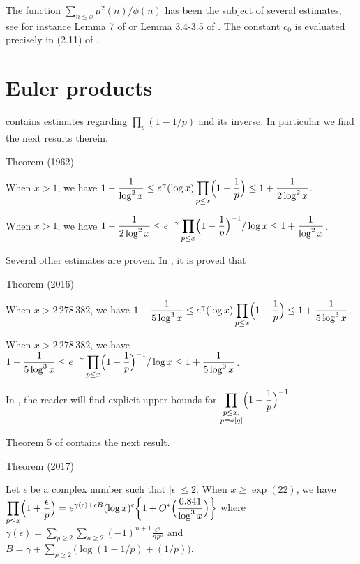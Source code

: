 The function $\sum_{n\le x}\mu^2(n)/\phi(n)$ has been the subject of
several estimates,
see for instance Lemma 7 of
\cite{Montgomery-Vaughan*73}
or Lemma 3.4-3.5 of
\cite{Ramare*95}.
The constant $c_0$ is evaluated precisely in (2.11) of
\cite{Rosser-Schoenfeld*62}.



\section{Euler products
}



\cite{Rosser-Schoenfeld*62}
contains estimates regarding $\prod_{p}(1-1/p)$ and its inverse. In
particular we find the next results therein.

\begin{thm}{Theorem (1962)}

  
    When $x > 1$, we have $\displaystyle 1-\frac{1}{\log^2x}\le
      e^\gamma(\log x)\prod_{p\le x}\Bigl(1-\frac{1}{p}\Bigr)\le
      1+\frac{1}{2\log^2x}$.
    
    When $x > 1$, we have $\displaystyle 1-\frac{1}{2\log^2x}\le
      e^{-\gamma}\prod_{p\le x}\Bigl(1-\frac{1}{p}\Bigr)^{-1}/\log x\le
      1+\frac{1}{\log^2x}$.
    
    
\end{thm}

Several other estimates are proven. In
\cite{Dusart*16}, it is
proved that

\begin{thm}{Theorem (2016)}

  
    When $x > 2\,278\,382$, we have $\displaystyle 1-\frac{1}{5\log^3x}\le
      e^\gamma(\log x)\prod_{p\le x}\Bigl(1-\frac{1}{p}\Bigr)\le
      1+\frac{1}{5\log^3x}$.
    
    When $x > 2\,278\,382$, we have $\displaystyle 1-\frac{1}{5\log^3x}\le
      e^{-\gamma}\prod_{p\le x}\Bigl(1-\frac{1}{p}\Bigr)^{-1}/\log x\le
      1+\frac{1}{5\log^3x}$.
    
    
\end{thm}


In \cite{Bordelles*05},
the reader will find explicit upper bounds for $\displaystyle
\prod_{\substack{p\le x,\\ p\equiv a[q]}}\Bigl(1-\frac{1}{p}\Bigr)^{-1}$

Theorem 5 of
\cite{Vanlalnagaia*15-1}
contains the next result.

\begin{thm}{Theorem (2017)}

  Let $\epsilon$ be a complex number such that $|\epsilon|\le 2$. When
  $x\ge\exp(22)$, we have
  $\displaystyle\prod_{p\le x}\Bigl(1+\frac{\epsilon}{p}\Bigr)
  =e^{\gamma(\epsilon)+\epsilon B}(\log x)^\epsilon
  \biggl\{1+O^*\Bigl(\frac{0.841}{\log^3x}\Bigr)\biggr\}$
  where
  $\displaystyle\gamma(\epsilon)=\sum_{p\ge2}\sum_{n\ge2}(-1)^{n+1}\frac{\epsilon^n}{np^n}$
  and
  $\displaystyle B=\gamma+\sum_{p\ge2}\bigl(\log(1-1/p)+(1/p)\bigr)$.
\end{thm}

